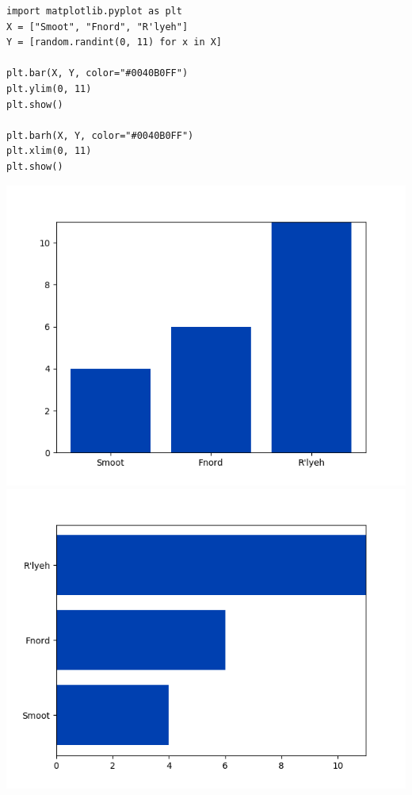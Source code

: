 
\begin{frame}[fragile]
%
\begin{tcbraster}[raster columns=2,
                  raster equal height,
                  nobeforeafter,
                  raster column skip=0.2cm]
\begin{codebox}
\begin{verbatim}
import matplotlib.pyplot as plt
X = ["Smoot", "Fnord", "R'lyeh"]
Y = [random.randint(0, 11) for x in X]

plt.bar(X, Y, color="#0040B0FF")
plt.ylim(0, 11)
plt.show()

plt.barh(X, Y, color="#0040B0FF")
plt.xlim(0, 11)
plt.show()
\end{verbatim}
\end{codebox}
%
\begin{tcolorbox}[title=Output: Bar Charts]
	\begin{center}
		\includegraphics[width=.7\linewidth]{./gfx/plt-bars} \\
		\includegraphics[width=.7\linewidth]{./gfx/plt-barh}
	\end{center}
\end{tcolorbox}
\end{tcbraster}
%
\end{frame}


